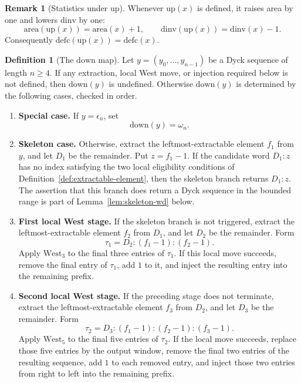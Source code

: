 \documentclass[11pt]{article}
\theoremstyle{plain}
\theoremstyle{definition}
\newtheorem{definition}[theorem]{Definition}
\newtheorem{remark}[theorem]{Remark}
\theoremstyle{remark}
\newcommand{\dinv}{\mathrm{dinv}}
\newcommand{\area}{\mathrm{area}}
\newcommand{\defc}{\mathrm{defc}}
\begin{document}
\begin{remark}[Statistics under \(\mathrm{up}\)]
\label{rem:up-statistics}
Whenever \(\mathrm{up}(x)\) is defined, it raises area by one and lowers
\(\dinv\) by one:
\[
  \area(\mathrm{up}(x))=\area(x)+1,
  \qquad
  \dinv(\mathrm{up}(x))=\dinv(x)-1.
\]
Consequently \(\defc(\mathrm{up}(x))=\defc(x)\).
\end{remark}

\begin{definition}[The \(\mathrm{down}\) map]
\label{def:down}
Let \(y=(y_0,\ldots,y_{n-1})\) be a Dyck sequence of length \(n\ge 4\).  If
any extraction, local West move, or injection required below is not defined,
then \(\mathrm{down}(y)\) is undefined.  Otherwise \(\mathrm{down}(y)\) is
determined by the following cases, checked in order.

\begin{enumerate}[label=\textup{(\arabic*)}]
  \item \textbf{Special case.}  If \(y=\epsilon_n\), set
  \[
    \mathrm{down}(y)=\omega_n.
  \]

  \item \textbf{Skeleton case.}  Otherwise, extract the leftmost-extractable
  element \(f_1\) from \(y\), and let \(D_1\) be the remainder.  Put
  \(z=f_1-1\).  If the candidate word \(D_1:z\) has no index satisfying the
  two local eligibility conditions of Definition~\ref{def:extractable-element},
  then the skeleton branch returns \(D_1:z\).  The assertion that this branch
  does return a Dyck sequence in the bounded range is part of
  Lemma~\ref{lem:skeleton-wd} below.

  \item \textbf{First local West stage.}  If the skeleton branch is not
  triggered, extract the leftmost-extractable element \(f_2\) from \(D_1\), and
  let \(D_2\) be the remainder.  Form
  \[
    \tau_1=D_2:(f_1-1):(f_2-1).
  \]
  Apply \(\mathrm{West}_3\) to the final three entries of \(\tau_1\).  If this
  local move succeeds, remove the final entry of \(\tau_1\), add \(1\) to it,
  and inject the resulting entry into the remaining prefix.

  \item \textbf{Second local West stage.}  If the preceding stage does not
  terminate, extract the leftmost-extractable element \(f_3\) from \(D_2\), and
  let \(D_3\) be the remainder.  Form
  \[
    \tau_2=D_3:(f_1-1):(f_2-1):(f_3-1).
  \]
  Apply \(\mathrm{West}_5\) to the final five entries of \(\tau_2\).  If the
  local move succeeds, replace those five entries by the output window, remove
  the final two entries of the resulting sequence, add \(1\) to each removed
  entry, and inject those two entries from right to left into the remaining
  prefix.


\end{enumerate}
\end{definition}
\end{document}
